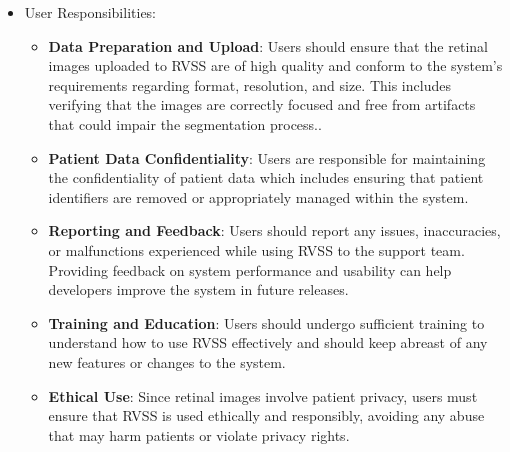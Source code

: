 \documentclass[12pt]{article}
\begin{document}
\begin{itemize}
\item User Responsibilities:
\begin{itemize}
\item \textbf{Data Preparation and Upload}: Users should ensure that the retinal images uploaded to RVSS are of high quality and conform to the system's requirements regarding format, resolution, and size. This includes verifying that the images are correctly focused and free from artifacts that could impair the segmentation process.. 
\item \textbf{Patient Data Confidentiality}: Users are responsible for maintaining the confidentiality of patient data which includes ensuring that patient identifiers are removed or appropriately managed within the system.
\item \textbf{Reporting and Feedback}: Users should report any issues, inaccuracies, or malfunctions experienced while using RVSS to the support team. Providing feedback on system performance and usability can help developers improve the system in future releases.
\item \textbf{Training and Education}: Users should undergo sufficient training to understand how to use RVSS effectively and should keep abreast of any new features or changes to the system.
\item \textbf{Ethical Use}: Since retinal images involve patient privacy, users must ensure that RVSS is used ethically and responsibly, avoiding any abuse that may harm patients or violate privacy rights.
\end{itemize}


\end{itemize}
\end{document}
